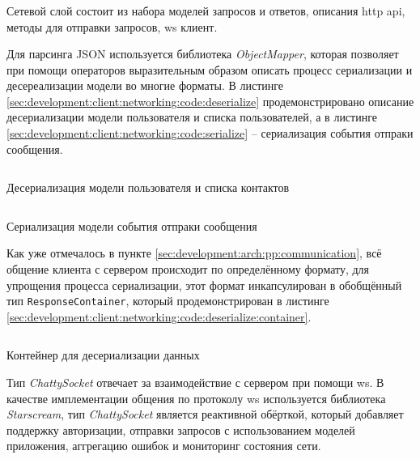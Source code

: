 \subsubsection{}
\label{sec:development:client:networking}

Сетевой слой состоит из набора моделей запросов и ответов, описания \gls{http} \gls{api}, методы для отправки запросов, \gls{ws} клиент.

Для парсинга JSON используется библиотека \textit{ObjectMapper}, которая позволяет при помощи операторов выразительным образом описать процесс сериализации и десереализации модели во многие форматы.
В листинге \ref{sec:development:client:networking:code:deserialize} продемонстрировано описание десериализации модели пользователя и списка пользователей, а в листинге \ref{sec:development:client:networking:code:serialize} -- сериализация события отпраки сообщения.

\begin{code}
	\inputminted{swift}{inc/src/deserealization.swift}
   \caption{Десериализация модели пользователя и списка контактов}
   \label{sec:development:client:networking:code:deserialize}
\end{code}

\begin{code}
	\inputminted{swift}{inc/src/serialization.swift}
   \caption{Сериализация модели события отпраки сообщения}
   \label{sec:development:client:networking:code:serialize}
\end{code}

Как уже отмечалось в пункте \ref{sec:development:arch:pp:communication}, всё общение клиента с сервером происходит по определённому формату, для упрощения процесса сериализации, этот формат инкапсулирован в обобщённый тип \texttt{ResponseContainer}, который продемонстрирован в листинге \ref{sec:development:client:networking:code:deserialize:container}.

\begin{code}
	\inputminted{swift}{inc/src/parsing_contaier.swift}
   \caption{Контейнер для десериализации данных}
   \label{sec:development:client:networking:code:deserialize:container}
\end{code}

Тип \textit{ChattySocket} отвечает за взаимодействие с сервером при помощи \gls{ws}. В качестве имплементации общения по протоколу \gls{ws} используется библиотека \textit{Starscream}, тип \textit{ChattySocket} является реактивной обёрткой, который добавляет поддержку авторизации, отправки запросов с использованием моделей приложения, аггрегацию ошибок и мониторинг состояния сети.

